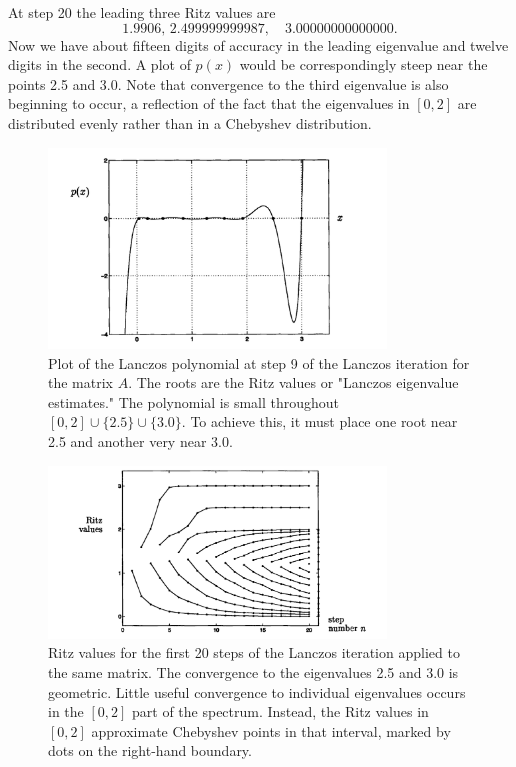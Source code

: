 At step 20 the leading three Ritz values are
$$
\text { 1.9906, } 2.499999999987, \quad 3.00000000000000 \text {. }
$$
Now we have about fifteen digits of accuracy in the leading eigenvalue and twelve digits in the second. A plot of $p(x)$ would be correspondingly steep near the points 2.5 and 3.0. Note that convergence to the third eigenvalue is also beginning to occur, a reflection of the fact that the eigenvalues in $[0,2]$ are distributed evenly rather than in a Chebyshev distribution.

\begin{figure}[H]
    \centering
    \includegraphics[width=0.8\textwidth]{figures/36-1.png}
    \caption{Plot of the Lanczos polynomial at step 9 of the Lanczos iteration for the matrix $ A $. The roots are the Ritz values or "Lanczos eigenvalue estimates." The polynomial is small throughout $[0,2] \cup\{2.5\} \cup\{3.0\}$. To achieve this, it must place one root near 2.5 and another very near 3.0.}
\end{figure}

\begin{figure}[H]
    \centering
    \includegraphics[width=0.8\textwidth]{figures/36-2.png}
    \caption{Ritz values for the first 20 steps of the Lanczos iteration applied to the same matrix. The convergence to the eigenvalues 2.5 and 3.0 is geometric. Little useful convergence to individual eigenvalues occurs in the $[0,2]$ part of the spectrum. Instead, the Ritz values in $[0,2]$ approximate Chebyshev points in that interval, marked by dots on the right-hand boundary.}
\end{figure}

